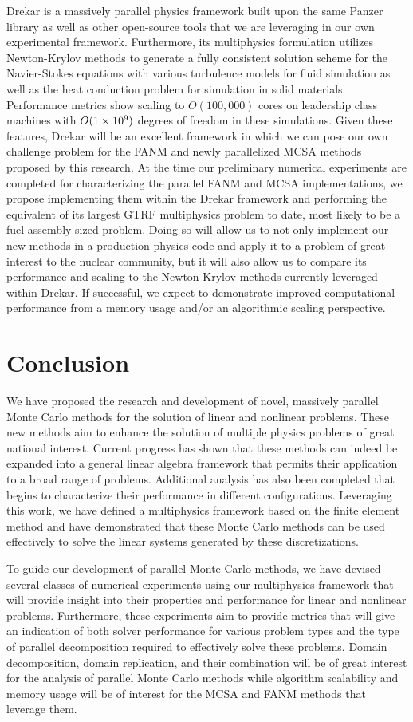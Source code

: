 Drekar is a massively parallel physics framework built upon the same
Panzer library as well as other open-source tools that we are
leveraging in our own experimental framework. Furthermore, its
multiphysics formulation utilizes Newton-Krylov methods to generate a
fully consistent solution scheme for the Navier-Stokes equations with
various turbulence models for fluid simulation as well as the heat
conduction problem for simulation in solid materials. Performance
metrics show scaling to $O(100,000)$ cores on leadership class
machines with $O(1\times 10^{9})$ degrees of freedom in these
simulations. Given these features, Drekar will be an excellent
framework in which we can pose our own challenge problem for the FANM
and newly parallelized MCSA methods proposed by this research. At the
time our preliminary numerical experiments are completed for
characterizing the parallel FANM and MCSA implementations, we propose
implementing them within the Drekar framework and performing the
equivalent of its largest GTRF multiphysics problem to date, most
likely to be a fuel-assembly sized problem. Doing so will allow us to
not only implement our new methods in a production physics code and
apply it to a problem of great interest to the nuclear community, but
it will also allow us to compare its performance and scaling to the
Newton-Krylov methods currently leveraged within Drekar. If
successful, we expect to demonstrate improved computational
performance from a memory usage and/or an algorithmic scaling
perspective.

\section{Conclusion}
\label{sec:conclusion}
We have proposed the research and development of novel, massively
parallel Monte Carlo methods for the solution of linear and nonlinear
problems. These new methods aim to enhance the solution of multiple
physics problems of great national interest. Current progress has
shown that these methods can indeed be expanded into a general linear
algebra framework that permits their application to a broad range of
problems. Additional analysis has also been completed that begins to
characterize their performance in different configurations. Leveraging
this work, we have defined a multiphysics framework based on the
finite element method and have demonstrated that these Monte Carlo
methods can be used effectively to solve the linear systems generated
by these discretizations.

To guide our development of parallel Monte Carlo methods, we have
devised several classes of numerical experiments using our
multiphysics framework that will provide insight into their properties
and performance for linear and nonlinear problems. Furthermore, these
experiments aim to provide metrics that will give an indication of
both solver performance for various problem types and the type of
parallel decomposition required to effectively solve these
problems. Domain decomposition, domain replication, and their
combination will be of great interest for the analysis of parallel
Monte Carlo methods while algorithm scalability and memory usage will
be of interest for the MCSA and FANM methods that leverage them.


